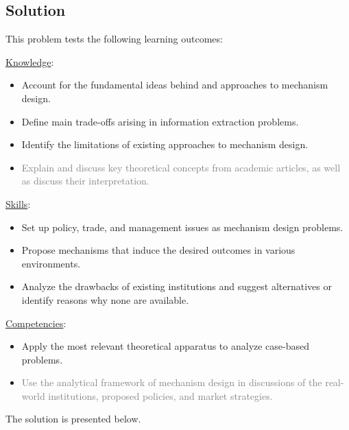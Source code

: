 \documentclass[a4paper]{article}
\newif\ifsolutions
\begin{document}
	
	
	\ifsolutions
	\subsection*{Solution}
	This problem tests the following learning outcomes:
	\begin{framed}
		\underline{Knowledge}:
		\begin{itemize}[$\circ$]
			\item {Account for the fundamental ideas behind and approaches to mechanism design.}
			\item {Define main trade-offs arising in information extraction problems.}
			\item {Identify the limitations of existing approaches to mechanism design.}
			\item \textcolor{gray}{Explain and discuss key theoretical concepts from academic articles, as well as discuss their interpretation.}
		\end{itemize}
		\underline{Skills}:
		\begin{itemize}[$\circ$]
			\item {Set up policy, trade, and management issues as mechanism design problems.}
			\item {Propose mechanisms that induce the desired outcomes in various environments.}
			\item {Analyze the drawbacks of existing institutions and suggest alternatives or identify reasons why none are available.}
		\end{itemize}
		\underline{Competencies}:
		\begin{itemize}[$\circ$]
			\item {Apply the most relevant theoretical apparatus to analyze case-based problems.}
			\item \textcolor{gray}{Use the analytical framework of mechanism design in discussions of the real-world institutions, proposed policies, and market strategies.}
		\end{itemize}
	\end{framed}
	
	The solution is presented below.
	
\end{document}
